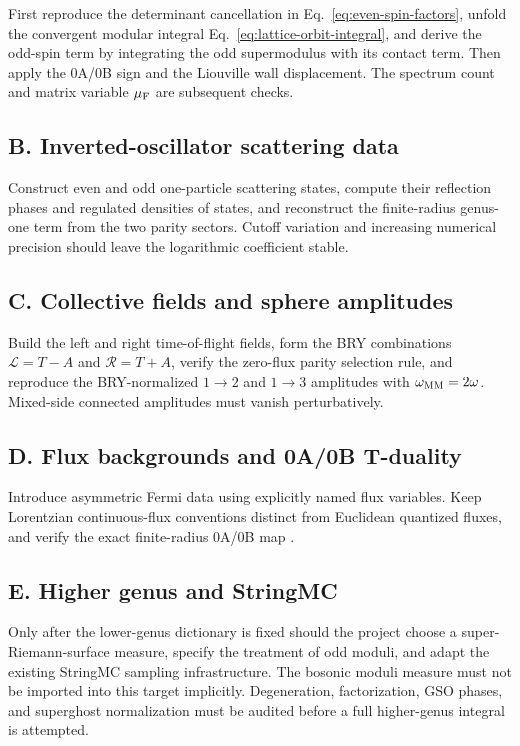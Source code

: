 \documentclass[11pt]{article}
\begin{document}
First reproduce the determinant cancellation in
Eq.~\eqref{eq:even-spin-factors}, unfold the convergent modular integral
Eq.~\eqref{eq:lattice-orbit-integral}, and derive the odd-spin term by
integrating the odd supermodulus with its contact term.  Then apply the
0A/0B sign and the Liouville wall displacement.  The spectrum count and
matrix variable $\mu_{\rm F}$ are subsequent checks.

\subsection*{B. Inverted-oscillator scattering data}

Construct even and odd one-particle scattering states, compute their reflection
phases and regulated densities of states, and reconstruct the finite-radius
genus-one term from the two parity sectors.  Cutoff variation and increasing
numerical precision should leave the logarithmic coefficient stable.

\subsection*{C. Collective fields and sphere amplitudes}

Build the left and right time-of-flight fields, form the BRY combinations
\(\mathcal L=T-A\) and \(\mathcal R=T+A\), verify the zero-flux parity
selection rule, and reproduce the BRY-normalized $1\to2$ and $1\to3$
amplitudes with $\omega_{\rm MM}=2\omega$.  Mixed-side connected amplitudes
must vanish perturbatively.

\subsection*{D. Flux backgrounds and 0A/0B T-duality}

Introduce asymmetric Fermi data using explicitly named flux variables.  Keep
Lorentzian continuous-flux conventions distinct from Euclidean quantized
fluxes, and verify the exact finite-radius 0A/0B map
\cite{GukovTakayanagiToumbas2004Flux,MaldacenaSeiberg2005FluxVacua}.

\subsection*{E. Higher genus and StringMC}

Only after the lower-genus dictionary is fixed should the project choose a
super-Riemann-surface measure, specify the treatment of odd moduli, and adapt
the existing StringMC sampling infrastructure.  The bosonic moduli measure
must not be imported into this target implicitly.  Degeneration,
factorization, GSO phases, and superghost normalization must be audited before
a full higher-genus integral is attempted.
\end{document}
